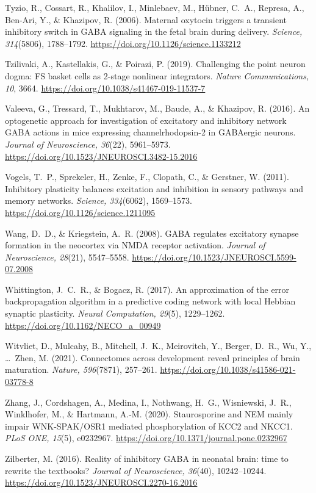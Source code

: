 \documentclass[11pt,a4paper]{article}
\newenvironment{apabib}{\raggedright\begin{list}{}{%
  \setlength{\leftmargin}{1.6em}\setlength{\itemindent}{-1.6em}%
  \setlength{\itemsep}{3pt}\setlength{\parsep}{0pt}\setlength{\topsep}{4pt}}}%
  {\end{list}}
\begin{document}
\begin{apabib}
\item Tyzio, R., Cossart, R., Khalilov, I., Minlebaev, M., H\"ubner, C.~A., Represa, A., Ben-Ari, Y., \& Khazipov, R. (2006). Maternal oxytocin triggers a transient inhibitory switch in GABA signaling in the fetal brain during delivery. \emph{Science, 314}(5806), 1788--1792. \url{https://doi.org/10.1126/science.1133212}
\item Tzilivaki, A., Kastellakis, G., \& Poirazi, P. (2019). Challenging the point neuron dogma: FS basket cells as 2-stage nonlinear integrators. \emph{Nature Communications, 10}, 3664. \url{https://doi.org/10.1038/s41467-019-11537-7}
\item Valeeva, G., Tressard, T., Mukhtarov, M., Baude, A., \& Khazipov, R. (2016). An optogenetic approach for investigation of excitatory and inhibitory network GABA actions in mice expressing channelrhodopsin-2 in GABAergic neurons. \emph{Journal of Neuroscience, 36}(22), 5961--5973. \url{https://doi.org/10.1523/JNEUROSCI.3482-15.2016}
\item Vogels, T.~P., Sprekeler, H., Zenke, F., Clopath, C., \& Gerstner, W. (2011). Inhibitory plasticity balances excitation and inhibition in sensory pathways and memory networks. \emph{Science, 334}(6062), 1569--1573. \url{https://doi.org/10.1126/science.1211095}
\item Wang, D.~D., \& Kriegstein, A.~R. (2008). GABA regulates excitatory synapse formation in the neocortex via NMDA receptor activation. \emph{Journal of Neuroscience, 28}(21), 5547--5558. \url{https://doi.org/10.1523/JNEUROSCI.5599-07.2008}
\item Whittington, J.~C.~R., \& Bogacz, R. (2017). An approximation of the error backpropagation algorithm in a predictive coding network with local Hebbian synaptic plasticity. \emph{Neural Computation, 29}(5), 1229--1262. \url{https://doi.org/10.1162/NECO\_a\_00949}
\item Witvliet, D., Mulcahy, B., Mitchell, J.~K., Meirovitch, Y., Berger, D.~R., Wu, Y., \ldots\ Zhen, M. (2021). Connectomes across development reveal principles of brain maturation. \emph{Nature, 596}(7871), 257--261. \url{https://doi.org/10.1038/s41586-021-03778-8}
\item Zhang, J., Cordshagen, A., Medina, I., Nothwang, H.~G., Wisniewski, J.~R., Winklhofer, M., \& Hartmann, A.-M. (2020). Staurosporine and NEM mainly impair WNK-SPAK/OSR1 mediated phosphorylation of KCC2 and NKCC1. \emph{PLoS ONE, 15}(5), e0232967. \url{https://doi.org/10.1371/journal.pone.0232967}
\item Zilberter, M. (2016). Reality of inhibitory GABA in neonatal brain: time to rewrite the textbooks? \emph{Journal of Neuroscience, 36}(40), 10242--10244. \url{https://doi.org/10.1523/JNEUROSCI.2270-16.2016}
\end{apabib}
\end{document}
